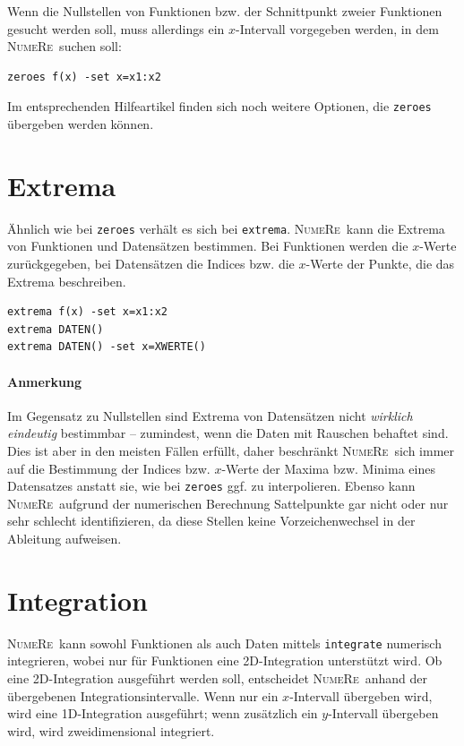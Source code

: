 \documentclass[DIV=14,headsepline,footsepline]{scrbook}
\newcommand{\NR}{\textsc{Nu\-me\-Re}}
\begin{document}
				Wenn die Nullstellen von Funktionen bzw. der Schnittpunkt zweier Funktionen gesucht werden soll, muss allerdings ein $x$-Intervall vorgegeben werden, in dem \NR\ suchen soll:
				\begin{lstlisting}
zeroes f(x) -set x=x1:x2
				\end{lstlisting}
				
				Im entsprechenden Hilfeartikel finden sich noch weitere Optionen, die \lstinline+zeroes+ übergeben werden können.
				
			\section{Extrema}
				Ähnlich wie bei \lstinline+zeroes+ verhält es sich bei \lstinline+extrema+. \NR\ kann die Extrema von Funktionen und Datensätzen bestimmen. Bei Funktionen werden die $x$-Werte zurückgegeben, bei Datensätzen die Indices bzw. die $x$-Werte der Punkte, die das Extrema beschreiben.
				\begin{lstlisting}
extrema f(x) -set x=x1:x2
extrema DATEN()
extrema DATEN() -set x=XWERTE()
				\end{lstlisting}
				\paragraph{Anmerkung}Im Gegensatz zu Nullstellen sind Extrema von Datensätzen nicht \emph{wirklich eindeutig} bestimmbar -- zumindest, wenn die Daten mit Rauschen behaftet sind. Dies ist aber in den meisten Fällen erfüllt, daher beschränkt \NR\ sich immer auf die Bestimmung der Indices bzw. $x$-Werte der Maxima bzw. Minima eines Datensatzes anstatt sie, wie bei \lstinline+zeroes+ ggf. zu interpolieren. Ebenso kann \NR\ aufgrund der numerischen Berechnung Sattelpunkte gar nicht oder nur sehr schlecht identifizieren, da diese Stellen keine Vorzeichenwechsel in der Ableitung aufweisen.
				
			\section{Integration}
				\NR\ kann sowohl Funktionen als auch Daten mittels \lstinline+integrate+ numerisch integrieren, wobei nur für Funktionen eine 2D-Integration unterstützt wird. Ob eine 2D-Integration ausgeführt werden soll, entscheidet \NR\ anhand der übergebenen Integrationsintervalle. Wenn nur ein $x$-Intervall übergeben wird, wird eine 1D-Integration ausgeführt; wenn zusätzlich ein $y$-Intervall übergeben wird, wird zweidimensional integriert.
				
\end{document}
